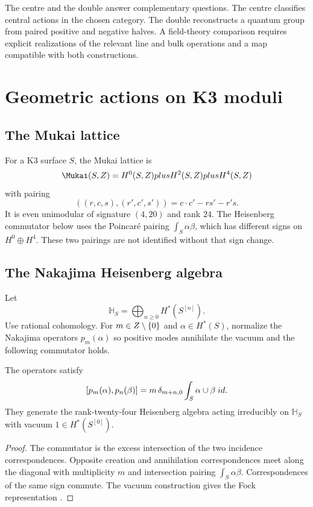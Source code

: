 The centre and the double answer complementary questions.
The centre classifies central actions in the chosen category.
The double reconstructs a quantum group from paired positive and negative halves.
A field-theory comparison requires explicit realizations of the relevant
line and bulk operations and a map compatible with both constructions.

\chapter{Geometric actions on K3 moduli}

\section{The Mukai lattice}
For a K3 surface $S$, the Mukai lattice is
\[
 \Mukai(S,\Z)=H^0(S,\Z)\oplus H^2(S,\Z)\oplus H^4(S,\Z)
\]
with pairing
\[
 ((r,c,s),(r',c',s'))=c\cdot c'-rs'-r's.
\]
It is even unimodular of signature $(4,20)$ and rank $24$.
The Heisenberg commutator below uses the Poincar\'e pairing
$\int_S\alpha\beta$, which has different signs on $H^0\oplus H^4$.
These two pairings are not identified without that sign change.

\section{The Nakajima Heisenberg algebra}
Let
\[
 \mathbb H_S=\bigoplus_{n\ge0}H^*(S^{[n]}).
\]
Use rational cohomology. For $m\in Z\setminus\{0\}$ and $\alpha\in H^*(S)$, normalize the Nakajima operators $p_m(\alpha)$ so positive modes annihilate the vacuum and the following commutator holds.

\begin{theorem}
The operators satisfy
\[
 [p_m(\alpha),p_n(\beta)]
 =m\,\delta_{m+n,0}\int_S\alpha\cup\beta\;id.
\]
They generate the rank-twenty-four Heisenberg algebra acting irreducibly on $\mathbb H_S$ with vacuum $1\in H^*(S^{[0]})$.
\end{theorem}
\begin{proof}
The commutator is the excess intersection of the two incidence correspondences. Opposite creation and annihilation correspondences meet along the diagonal with multiplicity $m$ and intersection pairing $\int_S\alpha\beta$. Correspondences of the same sign commute. The vacuum construction gives the Fock representation \cite{Nakajima97}.
\end{proof}

